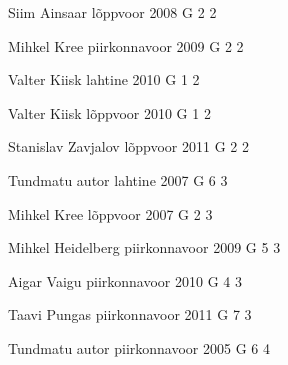 \documentclass[11pt]{article}
\begin{document}
{Siim Ainsaar} %
{lõppvoor} %
{2008} %
{G 2} %
{2} %
{

\ifEngHint
\fi
}

{Mihkel Kree} %
{piirkonnavoor} %
{2009} %
{G 2} %
{2} %
{

\ifEngHint
\fi
}

{Valter Kiisk} %
{lahtine} %
{2010} %
{G 1} %
{2} %
{

\ifEngHint
\fi
}

{Valter Kiisk} %
{lõppvoor} %
{2010} %
{G 1} %
{2} %
{

\ifEngHint
\fi
}

{Stanislav Zavjalov} %
{lõppvoor} %
{2011} %
{G 2} %
{2} %
{

\ifEngHint
\fi
}

{Tundmatu autor} %
{lahtine} %
{2007} %
{G 6} %
{3} %
{

\ifEngHint
\fi
}

{Mihkel Kree} %
{lõppvoor} %
{2007} %
{G 2} %
{3} %
{

\ifEngHint
\fi
}

{Mihkel Heidelberg} %
{piirkonnavoor} %
{2009} %
{G 5} %
{3} %
{

\ifEngHint
\fi
}

{Aigar Vaigu} %
{piirkonnavoor} %
{2010} %
{G 4} %
{3} %
{

\ifEngHint
\fi
}

{Taavi Pungas} %
{piirkonnavoor} %
{2011} %
{G 7} %
{3} %
{

\ifEngHint
\fi
}

{Tundmatu autor} %
{piirkonnavoor} %
{2005} %
{G 6} %
{4} %
{

\ifEngHint
\fi
}
\end{document}
